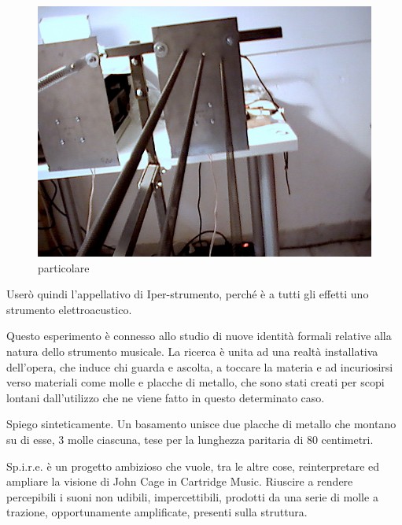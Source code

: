 
\begin{figure}[htbp]
\begin{center}
\includegraphics[]{../Graphics/Prototipo2.jpg}
\caption{particolare}
\label{default}
\end{center}
\end{figure}

Userò quindi l'appellativo di Iper-strumento, perché è a tutti gli effetti uno strumento elettroacustico.

Questo esperimento è connesso allo studio di nuove identità formali relative alla natura dello strumento musicale.  La ricerca è unita ad una realtà installativa dell'opera, che induce chi guarda e ascolta, a toccare la materia e ad incuriosirsi verso materiali come molle e placche di metallo, che sono stati creati per scopi lontani dall'utilizzo che ne viene fatto in questo determinato caso.

Spiego sinteticamente. Un basamento unisce due placche di metallo che montano su di esse, 3 molle ciascuna, tese per la lunghezza paritaria di 80 centimetri.

Sp.i.r.e. è un progetto ambizioso che vuole, tra le altre cose, reinterpretare ed ampliare la visione di John Cage in Cartridge Music. Riuscire a rendere percepibili i suoni non udibili,  impercettibili, prodotti da una serie di molle a trazione, opportunamente amplificate, presenti sulla struttura.

